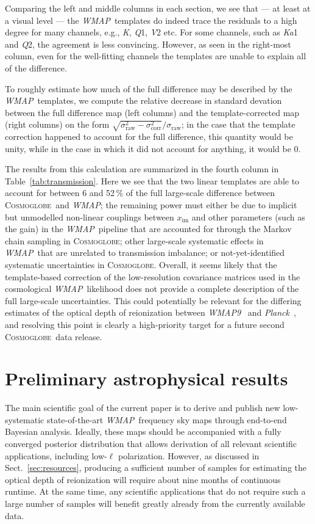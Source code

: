 \documentclass[twocolumn]{../../common/aa}
\def\WMAP{\emph{WMAP}}
\def\WMAPnine{\emph{WMAP9}}
\def\Planck{\emph{Planck}}
\newcommand{\cosmoglobe}{\textsc{Cosmoglobe}}
\newcommand{\K}[0]{\textit K}
\newcommand{\Ka}[0]{\textit{Ka}}
\newcommand{\Q}[0]{\textit Q}
\newcommand{\V}[0]{\textit V}
\begin{document}
Comparing the left and middle columns in each section, we see that --- at least at a visual level --- the \WMAP\ templates do indeed trace the residuals to a high degree for many channels, e.g., \K, \Q1, \V2 etc. For some channels, such as \Ka1 and \Q2, the agreement is less convincing. However, as seen in the right-most column, even for the well-fitting channels the templates are unable to explain all of the difference.

To roughly estimate how much of the full difference may be described by the \WMAP\ templates, we compute the relative decrease in standard devation between the full difference map (left columns) and the template-corrected map (right columns) on the form $\sqrt{\sigma_{\mathrm{raw}}^2 - \sigma_{\mathrm{corr}}^2}/\sigma_{\mathrm{raw}}$; in the case that the template correction happened to account for the full difference, this quantity would be unity, while in the case in which it did not account for anything, it would be 0.

The results from this calculation are summarized in the fourth column in Table~\ref{tab:transmission}. Here we see that the two linear templates are able to account for between 6 and 52\,\% of the full large-scale difference between \cosmoglobe\ and \WMAP; the remaining power must either be due to implicit but unmodelled non-linear couplings between $x_{\mathrm{im}}$ and other parameters (such as the gain) in the \WMAP\ pipeline that are accounted for through the Markov chain sampling in \cosmoglobe; other large-scale systematic effects in \WMAP\ that are unrelated to transmission imbalance; or not-yet-identified systematic uncertainties in \cosmoglobe. Overall, it seems likely that the template-based correction of the low-resolution covariance matrices used in the cosmological \WMAP\ likelihood does not provide a complete description of the full large-scale uncertainties. This could potentially be relevant for the differing estimates of the optical depth of reionization between \WMAPnine\ \citep{hinshaw2012} and \Planck\ \citep{planck2016-l05}, and resolving this point is clearly a high-priority target for a future second \cosmoglobe\ data release.


\section{Preliminary astrophysical results}
\label{sec:astrophysics}

The main scientific goal of the current paper is to derive and publish new low-systematic state-of-the-art \WMAP\ frequency sky maps through end-to-end Bayesian analysis. Ideally, these maps should be accompanied with a fully converged posterior distribution that allows derivation of all relevant scientific applications, including low-$\ell$ polarization. However, as discussed in Sect.~\ref{sec:resources}, producing a sufficient number of samples for estimating the optical depth of reionization will require about nine months of continuous runtime. At the same time, any scientific applications that do not require such a large number of samples will benefit greatly already from the currently available data.
\end{document}
